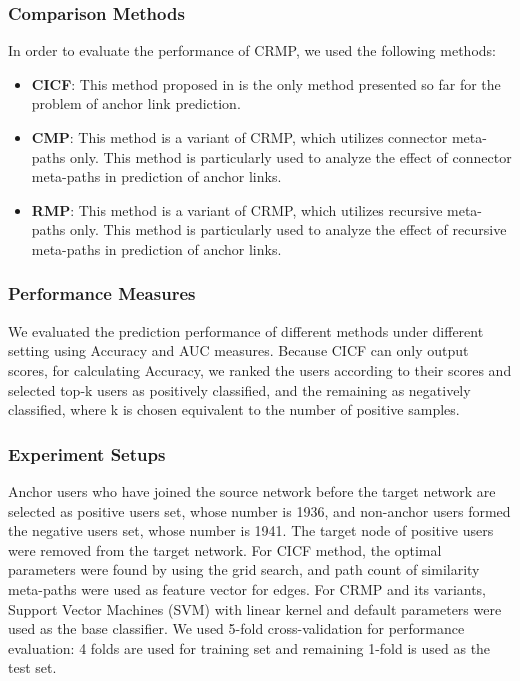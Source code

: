 \documentclass[conference]{IEEEtran}
\begin{document}
\subsubsection{Comparison Methods}
In order to evaluate the performance of CRMP, we used the following methods:
\begin{itemize}
\item \textbf{CICF}: This method proposed in \cite{wu2014learning} is the only method presented so far for the problem of anchor link prediction.
\item \textbf{CMP}: This method is a variant of CRMP, which utilizes connector meta-paths only. This method is particularly used to analyze the effect of connector meta-paths in prediction of anchor links.
\item \textbf{RMP}: This method is a variant of CRMP, which utilizes recursive meta-paths only. This method is particularly used to analyze the effect of recursive meta-paths in prediction of anchor links.
\end{itemize}

\subsubsection{Performance Measures}
We evaluated the prediction performance of different methods under different setting using Accuracy and AUC measures. Because CICF can only output scores, for calculating Accuracy, we ranked the users according to their scores and selected top-k users as positively classified, and the remaining as negatively classified, where k is chosen equivalent to the number of positive samples.

\subsubsection{Experiment Setups}
Anchor users who have joined the source network before the target network are selected as positive users set, whose number is 1936, and non-anchor users formed the negative users set, whose number is 1941. The target node of positive users were removed from the target network. For CICF method, the optimal parameters were found by using the grid search, and path count of similarity meta-paths were used as feature vector for edges. For CRMP and its variants, Support Vector Machines (SVM) with linear kernel and default parameters were used as the base classifier. We used 5-fold cross-validation for performance evaluation: 4 folds are used for training set and remaining 1-fold is used as the test set.
\end{document}
